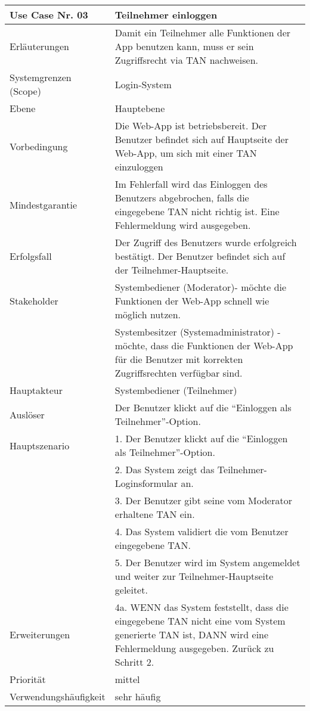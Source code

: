 \begin{tabularx}{\linewidth}{|l|X|}
	\hline
	Use Case Nr. 03			& \textbf{Teilnehmer einloggen} \\ \hline
	Erläuterungen			& Damit ein Teilnehmer alle Funktionen der App benutzen kann, 
							  muss er sein Zugriffsrecht via TAN nachweisen. \\ \hline
	Systemgrenzen (Scope)	& Login-System \\ \hline
	Ebene					& Hauptebene \\ \hline
	Vorbedingung			& Die Web-App ist betriebsbereit. Der Benutzer befindet sich auf
							  Hauptseite der Web-App, um sich mit einer TAN einzuloggen \\ \hline
	Mindestgarantie			& Im Fehlerfall wird das Einloggen des Benutzers abgebrochen, falls die
							  eingegebene TAN nicht richtig ist. Eine Fehlermeldung wird 
							  ausgegeben. \\ \hline
	Erfolgsfall 			& Der Zugriff des Benutzers wurde erfolgreich bestätigt. Der
							  Benutzer befindet sich auf der Teilnehmer-Hauptseite. \\ \hline
	Stakeholder				& Systembediener (Moderator)- möchte die Funktionen der Web-App 
							  schnell wie möglich nutzen. \\
							& Systembesitzer (Systemadministrator) - möchte, dass die Funktionen   
							  der Web-App für die Benutzer mit korrekten Zugriffsrechten verfügbar sind.\\ \hline
	Hauptakteur				& Systembediener (Teilnehmer) \\ \hline
	Auslöser				& Der Benutzer klickt auf die ``Einloggen als Teilnehmer''-Option.
							  \\ \hline
	Hauptszenario			& 1. Der Benutzer klickt auf die ``Einloggen als Teilnehmer''-Option.
							  \\
	                        & 2. Das System zeigt das Teilnehmer-Loginsformular an. \\
							& 3. Der Benutzer gibt seine vom Moderator erhaltene TAN ein. \\
							& 4. Das System validiert die vom Benutzer eingegebene
							  TAN. \\
							& 5. Der Benutzer wird im System angemeldet und weiter zur
							  Teilnehmer-Hauptseite geleitet. \\ \hline
	Erweiterungen			& 4a. WENN das System feststellt, dass die eingegebene TAN nicht 
							  eine vom System generierte TAN ist, DANN wird eine Fehlermeldung 
							  ausgegeben. Zurück zu Schritt 2. \\ \hline
	Priorität				& mittel \\ \hline
	Verwendungshäufigkeit	& sehr häufig \\ \hline
\end{tabularx}
